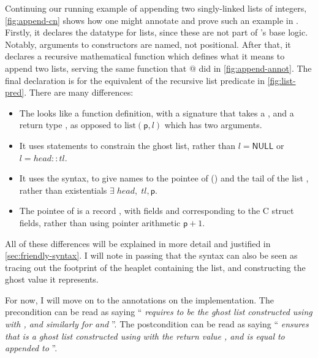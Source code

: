 Continuing our running example of appending two singly-linked lists of
integers, \cref{fig:append-cn} shows how one might annotate and prove such an
example in . Firstly, it declares the datatype for  lists,
since these are not part of 's base logic. Notably, arguments to
constructors are named, not positional. After that, it declares a recursive
\cninline{[rec]} mathematical function  which defines what
it means to append two lists, serving the same function that $@$ did in
\cref{fig:append-annot}. The final  declaration is for the equivalent of
the recursive list predicate in \cref{fig:list-pred}. There are many
differences:
\begin{itemize}
    \item The   looks like a function definition,
        with a signature that takes a , and a
        return type , as opposed to
        $\mathrm{list}(\mathsf{p}, l)$ which has two arguments.
    \item It uses  statements to constrain the ghost list,
        rather than $l = \mathsf{NULL}$ or $l = {head}{:}{:}{tl}$.
    \item It uses the  syntax, to give names to the pointee of
         () and the tail of the list ,
        rather than existentials $\exists{} \; {head}, \; {tl}, \mathsf{p}$.
    \item The pointee of  is a record , with fields
         and  corresponding to the C struct
        fields, rather than using pointer arithmetic $\mathsf{p} + 1$.
\end{itemize}

All of these differences will be explained in more detail and justified in
\cref{sec:friendly-syntax}. I will note in passing that the syntax can also be
seen as tracing out the footprint of the heaplet containing the list, and
constructing the ghost value it represents.

For now, I will move on to the annotations on the implementation. The
precondition can be read as saying ``\emph{ requires
 to be the ghost list constructed using 
with , and similarly for  and }''. The
postcondition can be read as saying ``\emph{ ensures that
 is a ghost list constructed using  with the
return value , and  is equal to 
appended to }''.

